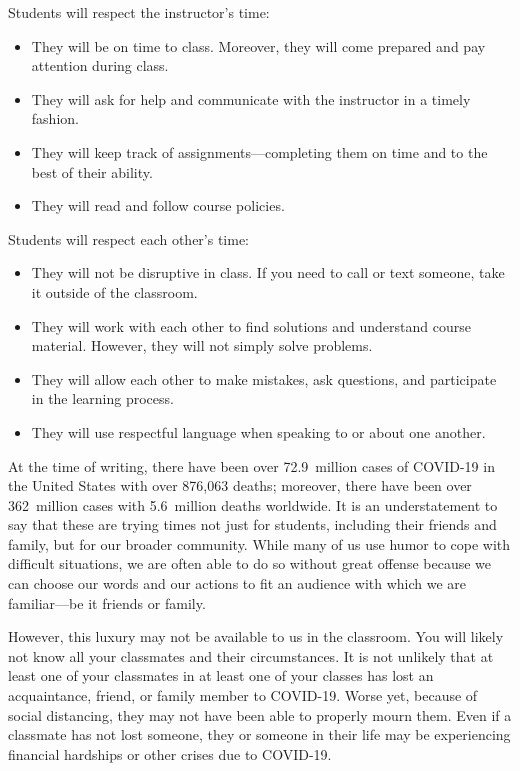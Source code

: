 \documentclass[11pt,letterpaper]{article}
\begin{document}
Students will respect the instructor's time:
	\begin{itemize}
	\item They will be on time to class. Moreover, they will come prepared and pay attention during class. 
	\item They will ask for help and communicate with the instructor in a timely fashion. 
	\item They will keep track of assignments---completing them on time and to the best of their ability.  
	\item They will read and follow course policies. 
	\end{itemize} \pspace

Students will respect each other's time:
	\begin{itemize}
	\item They will not be disruptive in class. If you need to call or text someone, take it outside of the classroom. 
	\item They will work with each other to find solutions and understand course material. However, they will not simply solve problems. 
	\item They will allow each other to make mistakes, ask questions, and participate in the learning process. 
	\item They will use respectful language when speaking to or about one another. 
	\end{itemize}
\sectionbreak



At the time of writing, there have been over 72.9~million cases of COVID-19 in the United States with over 876,063 deaths; moreover, there have been over 362~million cases with 5.6~million deaths worldwide. It is an understatement to say that these are trying times not just for students, including their friends and family, but for our broader community. While many of us use humor to cope with difficult situations, we are often able to do so without great offense because we can choose our words and our actions to fit an audience with which we are familiar---be it friends or family. \pspace

However, this luxury may not be available to us in the classroom. You will likely not know all your classmates and their circumstances. It is not unlikely that at least one of your classmates in at least one of your classes has lost an acquaintance, friend, or family member to COVID-19. Worse yet, because of social distancing, they may not have been able to properly mourn them. Even if a classmate has not lost someone, they or someone in their life may be experiencing financial hardships or other crises due to COVID-19. \pspace
\end{document}
